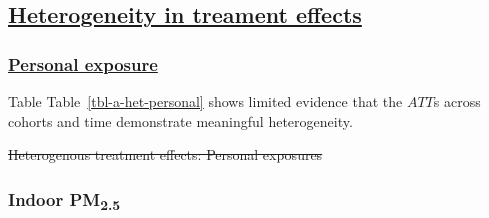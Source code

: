 \documentclass[
  letterpaper,
  DIV=11,
  numbers=noendperiod]{scrartcl}
\makeatletter
\renewenvironment{table}%
   {\renewcommand\familydefault\sfdefault
    \@float{table}}
   {\end@float}
\providecommand{\DIFadd}[1]{{\protect\color{blue}\underline{#1}}} %
\providecommand{\DIFdel}[1]{{\protect\color{red}\sout{#1}}}                      %
\providecommand{\DIFaddbegin}{} %
\providecommand{\DIFaddend}{} %
\providecommand{\DIFdelbegin}{} %
\providecommand{\DIFdelend}{} %
\providecommand{\DIFdelFL}[1]{\DIFdel{#1}} %
\providecommand{\DIFaddbeginFL}{} %
\providecommand{\DIFaddendFL}{} %
\providecommand{\DIFdelendFL}{} %
\newcommand{\DIFscaledelfig}{0.5}
\newlength{\DIFdelgraphicswidth} %
\newlength{\DIFdelgraphicsheight} %
\newcommand{\DIFaddincludegraphics}[2][]{{\color{blue}\fbox{\DIFOincludegraphics[#1]{#2}}}} %
\newcommand{\DIFdelincludegraphics}[2][]{%
\sbox{\DIFdelgraphicsbox}{\DIFOincludegraphics[#1]{#2}}%
\settoboxwidth{\DIFdelgraphicswidth}{\DIFdelgraphicsbox} %
\settoboxtotalheight{\DIFdelgraphicsheight}{\DIFdelgraphicsbox} %
\scalebox{\DIFscaledelfig}{%
\parbox[b]{\DIFdelgraphicswidth}{\usebox{\DIFdelgraphicsbox}\\[-\baselineskip] \rule{\DIFdelgraphicswidth}{0em}}\llap{\resizebox{\DIFdelgraphicswidth}{\DIFdelgraphicsheight}{%
\setlength{\unitlength}{\DIFdelgraphicswidth}%
\begin{picture}(1,1)%
\thicklines\linethickness{2pt} %
{\color[rgb]{1,0,0}\put(0,0){\framebox(1,1){}}}%
{\color[rgb]{1,0,0}\put(0,0){\line( 1,1){1}}}%
{\color[rgb]{1,0,0}\put(0,1){\line(1,-1){1}}}%
\end{picture}%
}\hspace*{3pt}}} %
} %
\DeclareRobustCommand{\DIFaddbegin}{\DIFOaddbegin \let\includegraphics\DIFaddincludegraphics} %
\DeclareRobustCommand{\DIFaddend}{\DIFOaddend \let\includegraphics\DIFOincludegraphics} %
\DeclareRobustCommand{\DIFdelbegin}{\DIFOdelbegin \let\includegraphics\DIFdelincludegraphics} %
\DeclareRobustCommand{\DIFdelend}{\DIFOaddend \let\includegraphics\DIFOincludegraphics} %
\DeclareRobustCommand{\DIFaddbeginFL}{\DIFOaddbeginFL \let\includegraphics\DIFaddincludegraphics} %
\DeclareRobustCommand{\DIFaddendFL}{\DIFOaddendFL \let\includegraphics\DIFOincludegraphics} %
\DeclareRobustCommand{\DIFdelendFL}{\DIFOaddendFL \let\includegraphics\DIFOincludegraphics} %
\makeatother
\begin{document}
\DIFdelend \newpage

\DIFdelbegin %
\DIFdelend \DIFaddbegin \subsection{\DIFadd{Heterogeneity in treament
effects}}\label{heterogeneity-in-treament-effects}
\DIFaddend 

\DIFdelbegin %
\DIFdelend \DIFaddbegin \subsubsection{\DIFadd{Personal exposure}}\label{personal-exposure}
\DIFaddend 

Table Table~\ref{tbl-a-het-personal} shows limited evidence that the
\(ATT\)s across cohorts and time demonstrate meaningful heterogeneity.

\DIFdelbegin %
{%
\DIFdelFL{Heterogenous treatment effects: Personal exposures }}%
\DIFdelendFL \DIFaddbeginFL \subsubsection{\texorpdfstring{Indoor
PM\textsubscript{2.5}}{Indoor PM2.5}}\label{indoor-pm2.5-1}
\DIFaddendFL 
\end{document}
